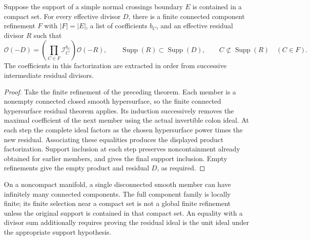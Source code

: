\begin{theorem}
\label{hir:compact-refined-boundary-residual}
\leanok
Suppose the support of a simple normal crossings boundary \(E\) is contained
in a compact set. For every effective divisor \(D\), there is a finite
connected component refinement \(F\) with \(|F|=|E|\), a list of
coefficients \(b_C\), and an effective residual divisor \(R\) such that
\[
 \mathcal O(-D)=\left(\prod_{C\in F}\mathcal I_C^{b_C}\right)
                  \mathcal O(-R),\qquad
 \operatorname{Supp}(R)\subset\operatorname{Supp}(D),
 \qquad C\not\subset\operatorname{Supp}(R)\quad(C\in F).
\]
The coefficients in this factorization are extracted in order from successive
intermediate residual divisors.
\end{theorem}
\begin{proof}
Take the finite refinement of the preceding theorem. Each member is a
nonempty connected closed smooth hypersurface, so the finite connected
hypersurface residual theorem applies. Its induction successively removes
the maximal coefficient of the next member using the actual invertible colon
ideal. At each step the complete ideal factors as the chosen hypersurface
power times the new residual. Associating these equalities produces the
displayed product factorization. Support inclusion at each step preserves
noncontainment already obtained for earlier members, and gives the final
support inclusion. Empty refinements give the empty product and residual
\(D\), as required.
\end{proof}

\begin{remark}
On a noncompact manifold, a single disconnected smooth member can have
infinitely many connected components. The full component family is locally
finite; its finite selection near a compact set is not a global finite
refinement unless the original support is contained in that compact set.
An equality with a divisor sum additionally requires proving the residual
ideal is the unit ideal under the appropriate support hypothesis.
\end{remark}
